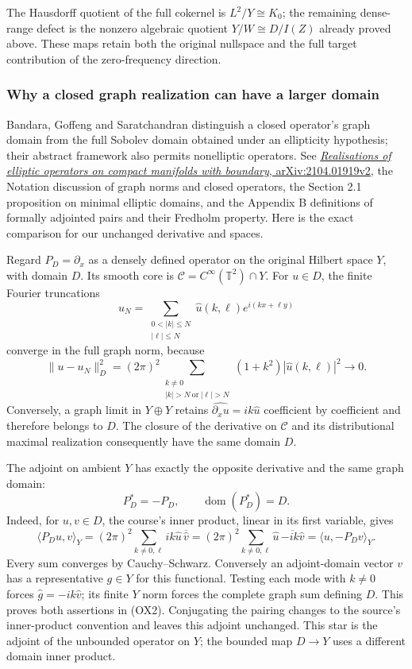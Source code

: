 \documentclass[
  11pt,
]{article}
\makeatletter
\let\ReaderOriginalAnchorStart\hyper@anchorstart
\let\ReaderOriginalAnchorEnd\hyper@anchorend
\let\ReaderPendingAliases\@empty
\def\ReaderArmAliases#1{\gdef\ReaderPendingAliases{#1}}
\def\hyper@anchorstart#1{\ReaderIfNativeAnchorTF{#1}{\ReaderPendingAliases\global\let\ReaderPendingAliases\@empty}{}\ReaderOriginalAnchorStart{#1}}
\makeatother
\begin{document}
The Hausdorff quotient of the full cokernel is \(L^2/Y\cong K_0\); the
remaining dense-range defect is the nonzero algebraic quotient
\(Y/W\cong D/I(Z)\) already proved above. These maps retain both the
original nullspace and the full target contribution of the
zero-frequency direction.

\ReaderArmAliases{\ReaderOriginalAnchorStart{why-a-closed-graph-realization-can-have-a-larger-domain}\ReaderOriginalAnchorEnd}
\subsubsection{Why a closed graph realization can have a larger
domain}\label{why-a-closed-graph-realization-can-have-a-larger-domain}

Bandara, Goffeng and Saratchandran distinguish a closed operator's graph
domain from the full Sobolev domain obtained under an ellipticity
hypothesis; their abstract framework also permits nonelliptic operators.
See \href{https://arxiv.org/abs/2104.01919v2}{\emph{Realisations of
elliptic operators on compact manifolds with boundary},
arXiv:2104.01919v2}, the Notation discussion of graph norms and closed
operators, the Section 2.1 proposition on minimal elliptic domains, and
the Appendix B definitions of formally adjointed pairs and their
Fredholm property. Here is the exact comparison for our unchanged
derivative and spaces.

Regard \(P_D=\partial_x\) as a densely defined operator on the original
Hilbert space \(Y\), with domain \(D\). Its smooth core is
\(\mathcal C=C^\infty(\mathbb T^2)\cap Y\). For \(u\in D\), the finite
Fourier truncations \[
u_N=\sum_{\substack{0<|k|\le N\\|\ell|\le N}}
\widehat u(k,\ell)e^{i(kx+\ell y)}
\] converge in the full graph norm, because \[
\|u-u_N\|_D^2=(2\pi)^2
\sum_{\substack{k\ne0\\|k|>N\ \mathrm{or}\ |\ell|>N}}
(1+k^2)|\widehat u(k,\ell)|^2\longrightarrow0.
\tag{OX1}
\] Conversely, a graph limit in \(Y\oplus Y\) retains
\(\widehat{\partial_xu}=ik\widehat u\) coefficient by coefficient and
therefore belongs to \(D\). The closure of the derivative on
\(\mathcal C\) and its distributional maximal realization consequently
have the same domain \(D\).

The adjoint on ambient \(Y\) has exactly the opposite derivative and the
same graph domain: \[
P_D^*=-P_D,\qquad\operatorname{dom}(P_D^*)=D.
\tag{OX2}
\] Indeed, for \(u,v\in D\), the course's inner product, linear in its
first variable, gives \[
\langle P_Du,v\rangle_Y
=(2\pi)^2\sum_{k\ne0,\ell}ik\widehat u\,\overline{\widehat v}
=(2\pi)^2\sum_{k\ne0,\ell}\widehat u\,
\overline{-ik\widehat v}=\langle u,-P_Dv\rangle_Y.
\] Every sum converges by Cauchy--Schwarz. Conversely an adjoint-domain
vector \(v\) has a representative \(g\in Y\) for this functional.
Testing each mode with \(k\ne0\) forces \(\widehat g=-ik\widehat v\);
its finite \(Y\) norm forces the complete graph sum defining \(D\). This
proves both assertions in (OX2). Conjugating the pairing changes to the
source's inner-product convention and leaves this adjoint unchanged.
This star is the adjoint of the unbounded operator on \(Y\); the bounded
map \(D\to Y\) uses a different domain inner product.
\end{document}
